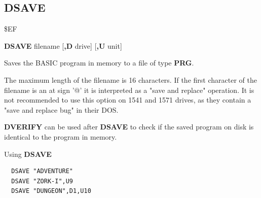
\newpage
\subsection{DSAVE}
\begin{description}[leftmargin=2cm,style=nextline]
\item [Token:] \$EF
\item [Format:] {\bf DSAVE} filename [{\bf,D} drive] [{\bf,U} unit]
\item [Usage:]
   Saves the BASIC program in memory to
   a file of type {\bf PRG}.

   \filenamedefinition
   The maximum length of the filename is 16 characters.
   If the first character of the filename is an at sign '@' it
   is interpreted as a "save and replace" operation. It is not recommended
   to use this option on 1541 and 1571 drives, as they
   contain a "save and replace bug" in their DOS.

   \drivedefinition

   \unitdefinition

\item [Remarks:]
   {\bf DVERIFY} can be used after {\bf DSAVE} to check
   if the saved program on disk is identical to the program
   in memory.

\item [Example:] Using {\bf DSAVE}
\begin{tcolorbox}[colback=black,coltext=white]
\verbatimfont{\codefont}
\begin{verbatim}
  DSAVE "ADVENTURE"
  DSAVE "ZORK-I",U9
  DSAVE "DUNGEON",D1,U10
\end{verbatim}
\end{tcolorbox}
\end{description}


\newpage
